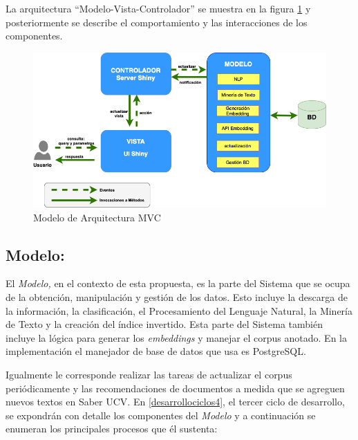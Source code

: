 \documentclass[
  12pt,
  openany]{book}
\begin{document}
La arquitectura ``Modelo-Vista-Controlador'' se muestra en la figura \ref{fig:arquitecturamvc} y posteriormente se describe el comportamiento y las interacciones de los componentes.

\begin{figure}

{\centering \includegraphics[width=0.9\linewidth]{images/05-desarrollo/MVC9} 

}

\caption{Modelo de Arquitectura MVC}\label{fig:arquitecturamvc}
\end{figure}

\hypertarget{modelo}{%
\subsection{\texorpdfstring{\textbf{Modelo:}}{Modelo:}}\label{modelo}}

El \emph{Modelo,} en el contexto de esta propuesta, es la parte del Sistema que se ocupa de la obtención, manipulación y gestión de los datos. Esto incluye la descarga de la información, la clasificación, el Procesamiento del Lenguaje Natural, la Minería de Texto y la creación del índice invertido. Esta parte del Sistema también incluye la lógica para generar los \emph{embeddings} y manejar el corpus anotado. En la implementación el manejador de base de datos que usa es PostgreSQL.

Igualmente le corresponde realizar las tareas de actualizar el corpus periódicamente y las recomendaciones de documentos a medida que se agreguen nuevos textos en Saber UCV. En \ref{desarrollociclos4}, el tercer ciclo de desarrollo, se expondrán con detalle los componentes del \emph{Modelo} y a continuación se enumeran los principales procesos que él sustenta:
\end{document}
